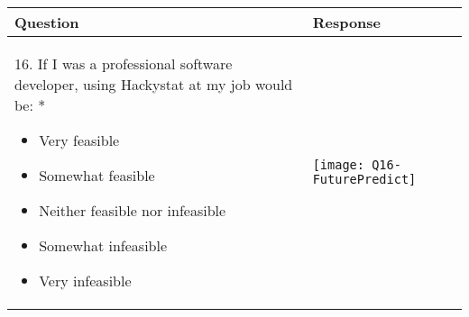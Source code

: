 \begin{center}
\footnotesize
\begin{tabular}{|m{}|m{}|}
\hline 
{\bf Question} & {\bf Response} \\ \hline
16. If I was a professional software developer, using Hackystat at my job would be: *
\begin{itemize}
\item Very feasible
\item Somewhat feasible
\item Neither feasible nor infeasible
\item Somewhat infeasible
\item Very infeasible
\end{itemize}
&
\texttt{[image: Q16-FuturePredict]} \\ \hline

\end{tabular}
\end{center}

